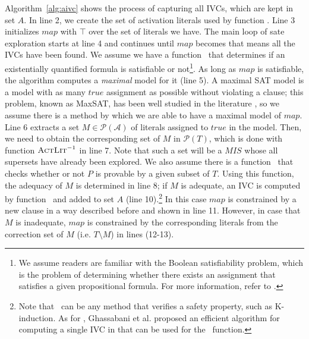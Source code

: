 

Algorithm~\ref{alg:aivc} shows the process of capturing all IVCs, which are kept in set $A$.
In line 2, we create the set of activation literals used by function \actlit . Line 3 initializes $map$ with $\top$ over the set of literals we have. The main loop of sate exploration starts at line 4 and continues until $map$ becomes \unsat that means all the IVCs have been found. We assume we have a function \checksat ~that determines if an existentially quantified formula  is satisfiable or not\footnote{We assume readers are familiar with the Boolean satisfiability problem, which is the problem of determining whether there exists an assignment that satisfies a given propositional formula. For more information, refer to \cite{cook1971complexity}.}.
As long as $map$ is satisfiable, the algorithm computes a \emph{maximal} \sat model for it (line 5). A maximal SAT model is a model with as many $true$ assignment as possible without violating a clause; this problem, known as MaxSAT, has been well studied in the literature \cite{cimatti2013modular, davies2011solving, morgado2013iterative}, so we assume there is a method by which we are able to have a maximal model of $map$.
Line 6 extracts a set $M \in \mathcal{P} (\mathcal{A})$ of literals assigned to $true$ in the model.
Then, we need to obtain the corresponding set of $M$ in $\mathcal{P}(T)$, which is done with function $\textsc{ActLit} ^{-1}$ in line 7. Note that such a set will be a $MIS$ whose all supersets have already been explored. We also assume there is a function \isadeq ~that checks whether or not $P$ is provable by a given subset of $T$. Using this function, the adequacy of $M$ is determined in line 8; if $M$ is adequate, an IVC  is computed by function \getivc ~and added to set $A$ (line 10).\footnote{Note that \isadeq ~can be any method that verifies a safety property, such as K-induction. As for \getivc , Ghassabani et al. proposed an efficient algorithm for computing a single IVC in \cite{Ghass16} that can be used for the \getivc ~function.} In this case $map$ is constrained by a new clause in a way described before and shown in line 11. However, in case that $M$ is inadequate, $map$ is constrained by the corresponding literals from the correction set of $M$ (i.e. $T \setminus M$) in lines (12-13).

